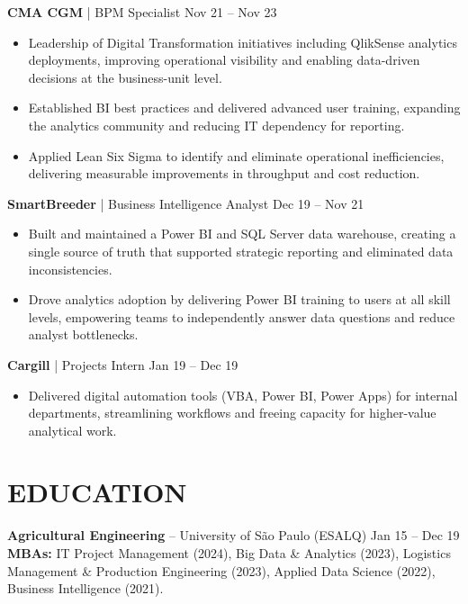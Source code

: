 \documentclass[9pt, letterpaper]{article}
\begin{document}
	\noindent \textbf{CMA CGM} | BPM Specialist \hfill Nov 21 -- Nov 23
	\begin{itemize}[noitemsep, topsep=1pt, leftmargin=1.5em, rightmargin=0.5cm]
		\item Leadership of Digital Transformation initiatives including QlikSense analytics deployments, improving operational visibility and enabling data-driven decisions at the business-unit level.
		\item Established BI best practices and delivered advanced user training, expanding the analytics community and reducing IT dependency for reporting.
		\item Applied Lean Six Sigma to identify and eliminate operational inefficiencies, delivering measurable improvements in throughput and cost reduction.
	\end{itemize}

	\noindent \textbf{SmartBreeder} | Business Intelligence Analyst \hfill Dec 19 -- Nov 21
	\begin{itemize}[noitemsep, topsep=1pt, leftmargin=1.5em, rightmargin=0.5cm]
		\item Built and maintained a Power BI and SQL Server data warehouse, creating a single source of truth that supported strategic reporting and eliminated data inconsistencies.
		\item Drove analytics adoption by delivering Power BI training to users at all skill levels, empowering teams to independently answer data questions and reduce analyst bottlenecks.
	\end{itemize}

	\noindent \textbf{Cargill} | Projects Intern \hfill Jan 19 -- Dec 19
	\begin{itemize}[noitemsep, topsep=1pt, leftmargin=1.5em, rightmargin=0.5cm]
		\item Delivered digital automation tools (VBA, Power BI, Power Apps) for internal departments, streamlining workflows and freeing capacity for higher-value analytical work.
	\end{itemize}

	\section*{EDUCATION}
	\noindent \textbf{Agricultural Engineering} -- University of São Paulo (ESALQ) \hfill Jan 15 -- Dec 19 \\
	\noindent \textbf{MBAs:} IT Project Management (2024), Big Data \& Analytics (2023), Logistics Management \& Production Engineering (2023), Applied Data Science (2022), Business Intelligence (2021).
\end{document}
